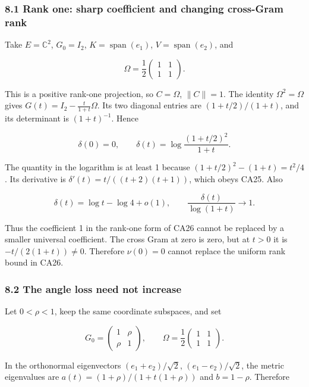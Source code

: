 \subsubsection{8.1 Rank one: sharp coefficient and changing cross-Gram rank}\label{rank-one-sharp-coefficient-and-changing-cross-gram-rank}

Take \(E=\mathbb C^2\), \(G_0=I_2\), \(K=\operatorname{span}(e_1)\), \(V=\operatorname{span}(e_2)\), and

\[
\Omega=\frac12\begin{pmatrix}1&1\\1&1\end{pmatrix}.
\]

This is a positive rank-one projection, so \(C=\Omega\), \(\|C\|=1\). The identity \(\Omega^2=\Omega\) gives \(G(t)=I_2-\frac{t}{1+t}\Omega\). Its two diagonal entries are \((1+t/2)/(1+t)\), and its determinant is \((1+t)^{-1}\). Hence

\[
\delta(0)=0,\qquad
\delta(t)=\log\frac{(1+t/2)^2}{1+t}.
\tag{CA39}
\]

The quantity in the logarithm is at least 1 because \((1+t/2)^2-(1+t)=t^2/4\). Its derivative is \(\delta'(t)=t/((t+2)(t+1))\), which obeys CA25. Also

\[
\delta(t)=\log t-\log4+o(1),\qquad
\frac{\delta(t)}{\log(1+t)}\longrightarrow1.
\]

Thus the coefficient 1 in the rank-one form of CA26 cannot be replaced by a smaller universal coefficient. The cross Gram at zero is zero, but at \(t>0\) it is \(-t/(2(1+t))\ne0\). Therefore \(\nu(0)=0\) cannot replace the uniform rank bound in CA26.

\subsubsection{8.2 The angle loss need not increase}\label{the-angle-loss-need-not-increase}

Let \(0<\rho<1\), keep the same coordinate subspaces, and set

\[
G_0=\begin{pmatrix}1&\rho\\\rho&1\end{pmatrix},\qquad
\Omega=\frac12\begin{pmatrix}1&1\\1&1\end{pmatrix}.
\]

In the orthonormal eigenvectors \((e_1+e_2)/\sqrt2\), \((e_1-e_2)/\sqrt2\), the metric eigenvalues are \(a(t)=(1+\rho)/(1+t(1+\rho))\) and \(b=1-\rho\). Therefore

